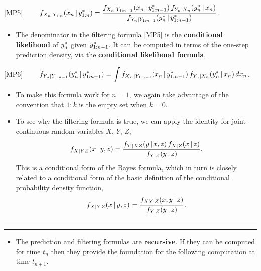 \documentclass[]{article}
\providecommand{\tightlist}{%
  \setlength{\itemsep}{0pt}\setlength{\parskip}{0pt}}
\begin{document}
{[}MP5{]}
\(\quad\quad \displaystyle f_{X_{n}|Y_{1:n}}(x_{n}{\, | \,} y_{1:n}^*) = \frac{ f_{X_{n}|Y_{1:n-1}}(x_{n}{\, | \,} y_{1:n-1}^*)\, f_{Y_n|X_n}(y_n^*{\, | \,} x_n) }{ f_{Y_{n}|Y_{1:n-1}}(y_n^*{\, | \,} y_{1:n-1}^*) }\).

\begin{itemize}
\tightlist
\item
  The denominator in the filtering formula {[}MP5{]} is the
  \textbf{conditional likelihood} of \(y_{n}^*\) given
  \(y_{1:n-1}^*\). It can be computed in terms of the one-step
  prediction density, via the \textbf{conditional likelihood formula},
\end{itemize}

{[}MP6{]}
\(\quad\quad \displaystyle f_{Y_{n}|Y_{1:n-1}}(y_n^*{\, | \,} y_{1:n-1}^*) = \int f_{X_{n}|Y_{1:n-1}}(x_{n}{\, | \,} y_{1:n-1}^*)\, f_{Y_n|X_n}(y_n^*{\, | \,} x_n)\, dx_n\).

\begin{itemize}
\item
  To make this formula work for \(n=1\), we again take advantage of the
  convention that \(1:k\) is the empty set when \(k=0\).
\item
  To see why the filtering formula is true, we can apply the identity
  for joint continuous random variables \(X\), \(Y\), \(Z\),
  \[f_{X|YZ}(x{\, | \,} y,z)= \frac{ f_{Y|XZ}(y{\, | \,} x,z)\, f_{X|Z}(x{\, | \,} z)}{f_{Y|Z}(y{\, | \,} z)}.\]
  This is a conditional form of the Bayes formula, which in turn is
  closely related to a conditional form of the basic definition of the
  conditional probability density function,
  \[f_{X|YZ}(x{\, | \,} y,z)= \frac{f_{XY|Z}(x,y{\, | \,} z)}{f_{Y|Z}(y{\, | \,} z)}.\]
\end{itemize}

\begin{center}\rule{0.5\linewidth}{\linethickness}\end{center}

\begin{center}\rule{0.5\linewidth}{\linethickness}\end{center}

\begin{itemize}
\tightlist
\item
  The prediction and filtering formulas are \textbf{recursive}. If they
  can be computed for time \(t_n\) then they provide the foundation for
  the following computation at time \(t_{n+1}\).
\end{itemize}
\end{document}
